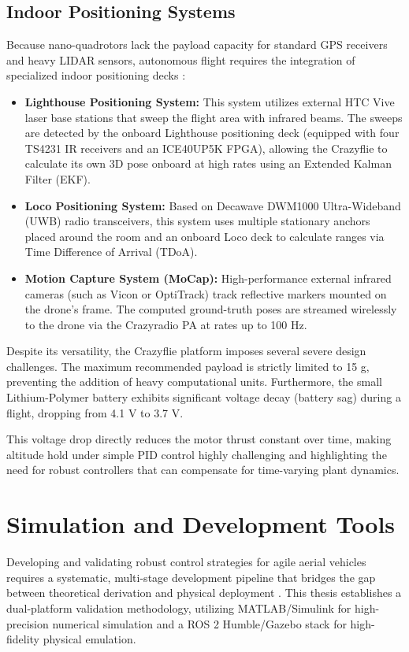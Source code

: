 \subsection{Indoor Positioning Systems}
Because nano-quadrotors lack the payload capacity for standard GPS receivers and heavy LIDAR sensors, autonomous flight requires the integration of specialized indoor positioning decks \cite{ref_14, ref_35}:
\begin{itemize}
    \item \textbf{Lighthouse Positioning System:} This system utilizes external HTC Vive laser base stations that sweep the flight area with infrared beams. The sweeps are detected by the onboard Lighthouse positioning deck (equipped with four TS4231 IR receivers and an ICE40UP5K FPGA), allowing the Crazyflie to calculate its own 3D pose onboard at high rates using an Extended Kalman Filter (EKF).
    \item \textbf{Loco Positioning System:} Based on Decawave DWM1000 Ultra-Wideband (UWB) radio transceivers, this system uses multiple stationary anchors placed around the room and an onboard Loco deck to calculate ranges via Time Difference of Arrival (TDoA).
    \item \textbf{Motion Capture System (MoCap):} High-performance external infrared cameras (such as Vicon or OptiTrack) track reflective markers mounted on the drone's frame. The computed ground-truth poses are streamed wirelessly to the drone via the Crazyradio PA at rates up to 100 Hz.
\end{itemize}

Despite its versatility, the Crazyflie platform imposes several severe design challenges. The maximum recommended payload is strictly limited to 15 g, preventing the addition of heavy computational units. Furthermore, the small Lithium-Polymer battery exhibits significant voltage decay (battery sag) during a flight, dropping from 4.1 V to 3.7 V. 

This voltage drop directly reduces the motor thrust constant over time, making altitude hold under simple PID control highly challenging and highlighting the need for robust controllers that can compensate for time-varying plant dynamics.

\section{Simulation and Development Tools}
Developing and validating robust control strategies for agile aerial vehicles requires a systematic, multi-stage development pipeline that bridges the gap between theoretical derivation and physical deployment \cite{ref_22}. This thesis establishes a dual-platform validation methodology, utilizing MATLAB/Simulink for high-precision numerical simulation and a ROS 2 Humble/Gazebo stack for high-fidelity physical emulation.

